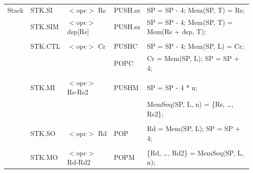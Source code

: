 \begin{table}
\begin{center}
\begin{tabular}{lllll}
Stack              & STK.SI            & $<$opc$>$ Rs                          & PUSH.sz           & SP = SP - 4; Mem(SP, T) = Rs;                                                 \\
                   & STK.SIM           & $<$opc$>$ dsp[Rs]                     & PUSH.sz           & SP = SP - 4; Mem(SP, T) = Mem(Rs + dsp, T);                                   \\
                   &                   &                                       &                   &                                                                               \\
                   & STK.CTL           & $<$opc$>$ Cr                          & PUSHC             & SP = SP - 4; Mem(SP, L) = Cr;                                                 \\
                   &                   &                                       & POPC              & Cr = Mem(SP, L); SP = SP + 4;                                                 \\
                   &                   &                                       &                   &                                                                               \\
                   & STK.MI            & $<$opc$>$ Rs-Rs2                      & PUSHM             & SP = SP - 4 * n;                                                              \\
                   &                   &                                       &                   & MemSeq(SP, L, n) = \{Rs, \ldots, Rs2\};                                       \\
                   &                   &                                       &                   &                                                                               \\
                   & STK.SO            & $<$opc$>$ Rd                          & POP               & Rd = Mem(SP, L); SP = SP + 4;                                                 \\
                   &                   &                                       &                   &                                                                               \\
                   & STK.MO            & $<$opc$>$ Rd-Rd2                      & POPM              & \{Rd, \ldots, Rd2\} = MemSeq(SP, L, n);                                       \\

\end{tabular}
\end{center}
\end{table}
